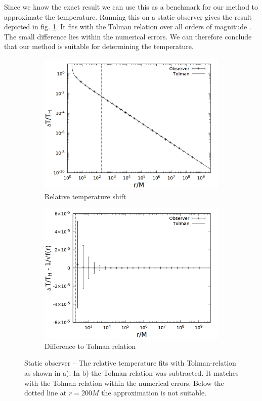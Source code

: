 Since we know the exact result we can use this as a benchmark for our method to approximate the temperature. Running this on a static observer  gives the result depicted in fig. \ref{fig:bh_stat}. It fits with the Tolman relation over all orders of magnitude . The small difference lies within the numerical errors. We can therefore conclude that our method is suitable for determining the temperature. 

\begin{figure}[h]
  \centering
  \begin{subfigure}[h]{0.5\textwidth}
    \centering
    \includegraphics[width=\textwidth]{cpp/final/stat.png}
    \caption{Relative temperature shift}
  \end{subfigure}%
  \begin{subfigure}[h]{0.5\textwidth}
    \centering
    \includegraphics[width=\textwidth]{cpp/final/stat_tolman.png}
    \caption{Difference to Tolman relation}
  \end{subfigure}
  \caption{Static observer -- The relative temperature fits with Tolman-relation as shown in a). In b) the Tolman relation was subtracted. It matches with the Tolman relation within the numerical errors. Below the dotted line at \(r = 200M\) the approximation is not suitable.}
  \label{fig:bh_stat}
\end{figure}
 
